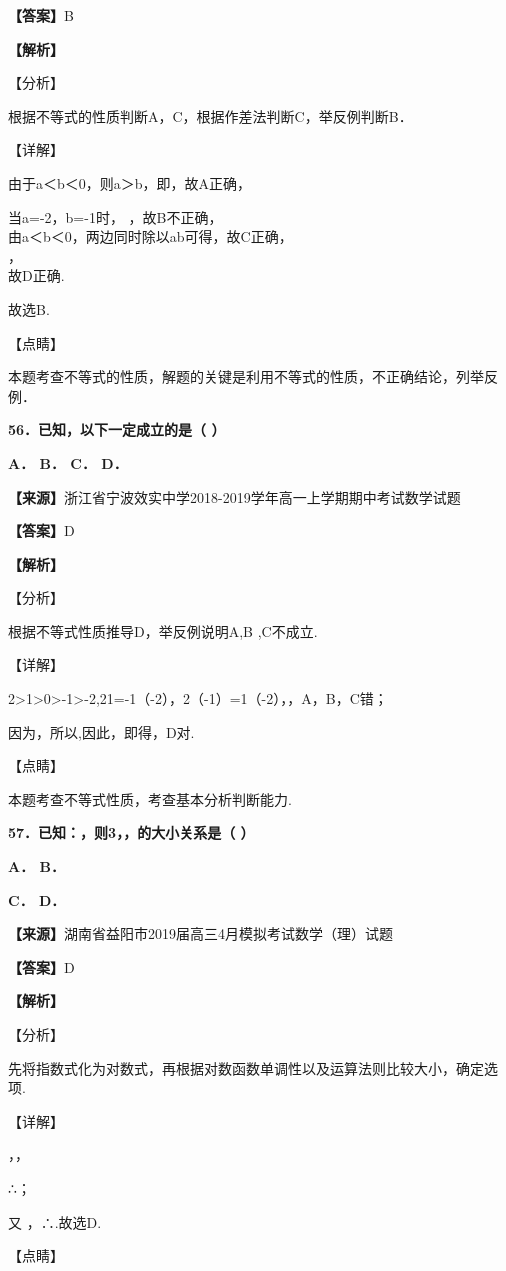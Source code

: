 \documentclass[
]{article}
\begin{document}
\textbf{【答案】}B

\textbf{【解析】}

【分析】

根据不等式的性质判断A，C，根据作差法判断C，举反例判断B．

【详解】

由于a＜b＜0，则\textbar a\textbar＞\textbar b\textbar，即，故A正确，

当a=-2，b=-1时， ，故B不正确，\\
由a＜b＜0，两边同时除以ab可得，故C正确，\\
，\\
故D正确.

故选B.

【点睛】

本题考查不等式的性质，解题的关键是利用不等式的性质，不正确结论，列举反例．

\textbf{56．已知，以下一定成立的是（ ）}

\textbf{A． B． C． D．}

\textbf{【来源】}浙江省宁波效实中学2018-2019学年高一上学期期中考试数学试题

\textbf{【答案】}D

\textbf{【解析】}

【分析】

根据不等式性质推导D，举反例说明A,B ,C不成立.

【详解】

2\textgreater1\textgreater0\textgreater-1\textgreater-2,21=-1（-2），2（-1）=1（-2），，A，B，C错；

因为，所以,因此，即得，D对.

【点睛】

本题考查不等式性质，考查基本分析判断能力.

\textbf{57．已知：，则3，，的大小关系是（ ）}

\textbf{A． B．}

\textbf{C． D．}

\textbf{【来源】}湖南省益阳市2019届高三4月模拟考试数学（理）试题

\textbf{【答案】}D

\textbf{【解析】}

【分析】

先将指数式化为对数式，再根据对数函数单调性以及运算法则比较大小，确定选项.

【详解】

，，

∴；

又 ，∴.故选D.

【点睛】
\end{document}
